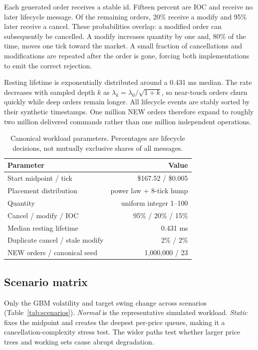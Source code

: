 \documentclass[10pt,twocolumn]{article}
\begin{document}
Each generated order receives a stable id.  Fifteen percent are IOC and receive
no later lifecycle message.  Of the remaining orders, 20\% receive a modify and
95\% later receive a cancel.  These probabilities overlap: a modified order can
subsequently be cancelled.  A modify increases quantity by one and, 80\% of the
time, moves one tick toward the market.  A small fraction of cancellations and
modifications are repeated after the order is gone, forcing both implementations to emit
the correct rejection.

Resting lifetime is exponentially distributed around a 0.431 ms median.  The
rate decreases with sampled depth $k$ as $\lambda_k=\lambda_0/\sqrt{1+k}$, so
near-touch orders churn quickly while deep orders remain longer.  All lifecycle
events are stably sorted by their synthetic timestamps.  One million NEW orders
therefore expand to roughly two million delivered commands rather than one
million independent operations.

\begin{table}[h]
\centering
\caption{Canonical workload parameters. Percentages are lifecycle decisions,
not mutually exclusive shares of all messages.}
\label{tab:params}
\scriptsize
\begin{tabular}{@{}lr@{}}
\toprule
Parameter & Value \\
\midrule
Start midpoint / tick & \$167.52 / \$0.005 \\
Placement distribution & power law + 8-tick hump \\
Quantity & uniform integer 1--100 \\
Cancel / modify / IOC & 95\% / 20\% / 15\% \\
Median resting lifetime & 0.431 ms \\
Duplicate cancel / stale modify & 2\% / 2\% \\
NEW orders / canonical seed & 1,000,000 / 23 \\
\bottomrule
\end{tabular}
\end{table}

\subsection{Scenario matrix}

Only the GBM volatility and target swing change across scenarios
(Table~\ref{tab:scenarios}).  \textit{Normal} is the representative simulated
workload.  \textit{Static} fixes the midpoint and creates the deepest per-price
queues, making it a cancellation-complexity stress test.  The wider paths test
whether larger price trees and working sets cause abrupt degradation.
\end{document}
